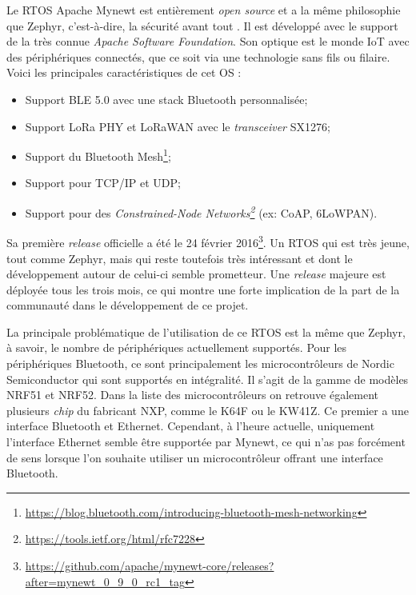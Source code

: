 Le RTOS Apache Mynewt est entièrement \textit{open source} et a la même philosophie que Zephyr, c'est-à-dire, la sécurité avant tout . Il est développé avec le support de la très connue \textit{Apache Software Foundation}. Son optique est le monde IoT avec des périphériques connectés, que ce soit via une technologie sans fils ou filaire. Voici les principales caractéristiques de cet OS :

\begin{itemize}
    \item Support BLE 5.0 avec une stack Bluetooth personnalisée;
    \item Support LoRa PHY et LoRaWAN avec le \textit{transceiver} SX1276;
    \item Support du Bluetooth Mesh\footnote{\url{https://blog.bluetooth.com/introducing-bluetooth-mesh-networking}};
    \item Support pour TCP/IP et UDP;
    \item Support pour des \textit{Constrained-Node Networks\footnote{\url{https://tools.ietf.org/html/rfc7228}}} (ex: CoAP, 6LoWPAN).
\end{itemize}


Sa première \textit{release} officielle a été le 24 février 2016\footnote{\url{https://github.com/apache/mynewt-core/releases?after=mynewt_0_9_0_rc1_tag}}. Un RTOS qui est très jeune, tout comme Zephyr, mais qui reste toutefois très intéressant et dont le développement autour de celui-ci semble prometteur. Une \textit{release} majeure est déployée tous les trois mois, ce qui montre une forte implication de la part de la communauté dans le développement de ce projet.

La principale problématique de l'utilisation de ce RTOS est la même que Zephyr, à savoir, le nombre de périphériques actuellement supportés. Pour les périphériques Bluetooth, ce sont principalement les microcontrôleurs de Nordic Semiconductor qui sont supportés en intégralité. Il s'agit de la gamme de modèles NRF51 et NRF52. Dans la liste des microcontrôleurs on retrouve également plusieurs \textit{chip} du fabricant NXP, comme le K64F ou le KW41Z. Ce premier a une interface Bluetooth et Ethernet. Cependant, à l'heure actuelle, uniquement l'interface Ethernet semble être supportée par Mynewt, ce qui n'as pas forcément de sens lorsque l'on souhaite utiliser un microcontrôleur offrant une interface Bluetooth. \\

